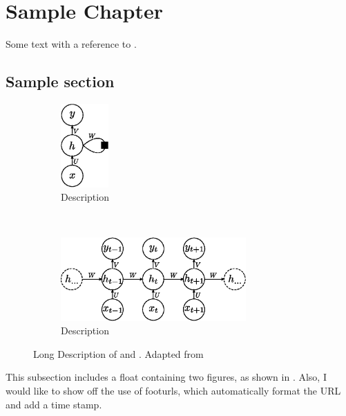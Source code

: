 \chapter{Sample Chapter}\label{chap:sample}

Some text with a reference to .

\section{Sample section}\label{sec:sample}

\begin{figure}[ht]
    \centering
    \begin{subfigure}[b]{0.45\textwidth}
        \centering
        \includegraphics[height=3.2cm]{img/rnn}
        \caption{Description}
        \label{fig:a}
    \end{subfigure}
    ~
    \begin{subfigure}[b]{0.45\textwidth}
        \centering
        \includegraphics[height=3.2cm]{img/rnn_unfolded}
        \caption{Description}
        \label{fig:b}
    \end{subfigure}
    \caption{Long Description of  and . Adapted from~\cite{Goodfellow-et-al-2016}}
    \label{fig:rnns}
\end{figure}

This subsection includes a float containing two figures, as shown in . Also, I would like to show off the use of footurls, which automatically format the URL and add a time stamp.